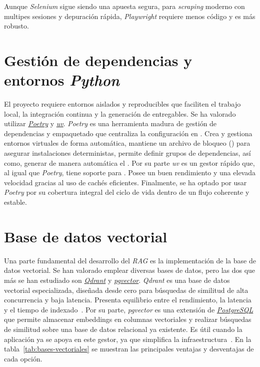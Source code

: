 Aunque \textit{Selenium} sigue siendo una apuesta segura, para \textit{scraping} moderno con multipes sesiones y depuración rápida, \textit{Playwright} requiere menos código y es más robusto. 

\section{Gestión de dependencias y entornos \textit{Python}}
El proyecto requiere entornos aislados y reproducibles que faciliten el trabajo local, la integración continua y la generación de entregables. Se ha valorado utilizar \href{http://python-poetry.org/docs/}{\textit{Poetry}} y \href{https://docs.astral.sh/uv/}{\textit{uv}}. \textit{Poetry} es una herramienta madura de gestión de dependencias y empaquetado que centraliza la configuración en . Crea y gestiona entornos virtuales de forma automática, mantiene un archivo de bloqueo () para asegurar instalaciones deterministas, permite definir grupos de dependencias, así como, generar de manera automática el . Por su parte \textit{uv} es un gestor rápido que, al igual que \textit{Poetry}, tiene soporte para . Posee un buen rendimiento y una elevada velocidad gracias al uso de cachés eficientes. Finalmente, se ha optado por usar \textit{Poetry} por su cobertura integral del ciclo de vida dentro de un flujo coherente y estable.


\section{Base de datos vectorial}
Una parte fundamental del desarrollo del \textit{RAG} es la implementación de la base de datos vectorial. Se han valorado emplear diversas bases de datos, pero las dos que más se han estudiado son \href{https://qdrant.tech/}{\textit{Qdrant}} y \href{https://www.datacamp.com/es/tutorial/pgvector-tutorial}{\textit{pgvector}}. \textit{Qdrant} es una base de datos vectorial especializada, diseñada desde cero para búsquedas de similitud de alta concurrencia y baja latencia. Presenta equilibrio entre el rendimiento, la latencia y el tiempo de indexado~\cite{llmeng:handbook}. Por su parte, \textit{pgvector} es una extensión de \href{https://www.postgresql.org/}{\textit{PostgreSQL}} que permite almacenar embeddings en columnas vectoriales y realizar búsquedas de similitud sobre una base de datos relacional ya existente. Es útil cuando la aplicación ya se apoya en este gestor, ya que simplifica la infraestructura~\cite{Qdrant:pgvector}. En la tabla~\ref{tab:bases-vectoriales} se muestran las principales ventajas y desventajas de cada opción.

